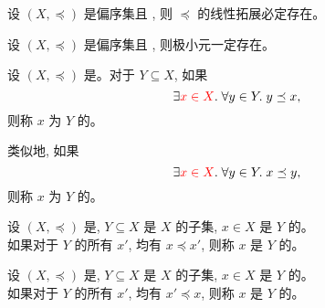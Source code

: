 \begin{frame}{}
  \begin{theorem}
    设 $(X, \preceq)$ 是偏序集且 , 则 $\preceq$ 的线性拓展必定存在。
  \end{theorem}


  \pause
  \vspace{0.30cm}
  \begin{theorem}
    设 $(X, \preceq)$ 是偏序集且 , 则极小元一定存在。
  \end{theorem}
\end{frame}

\begin{frame}{}
  \begin{definition}
    设 $(X, \preceq)$ 是。对于 $Y \subseteq X$, 如果
    \[
      \exists \textcolor{red}{x \in X}.\; \forall y \in Y.\; y \preceq x,
    \]
    则称 $x$ 为 $Y$ 的。

    \pause
    \vspace{0.30cm}
    类似地, 如果
    \[
      \exists \textcolor{red}{x \in X}.\; \forall y \in Y.\; x \preceq y,
    \]
    则称 $x$ 为 $Y$ 的。
  \end{definition}

  \pause
\end{frame}

\begin{frame}{}
  \begin{definition}
    设 $(X, \preceq)$ 是, $Y \subseteq X$ 是 $X$ 的子集,
    $x \in X$ 是 $Y$ 的。 \pause\\[5pt]
    如果对于 $Y$ 的所有 $x'$, 均有 $x \preceq x'$,
    则称 $x$ 是 $Y$ 的。
  \end{definition}

  \pause

  \pause
  \begin{definition}
    设 $(X, \preceq)$ 是, $Y \subseteq X$ 是 $X$ 的子集,
    $x \in X$ 是 $Y$ 的。 \\[5pt]
    如果对于 $Y$ 的所有 $x'$, 均有 $x' \preceq x$,
    则称 $x$ 是 $Y$ 的。
  \end{definition}
\end{frame}

